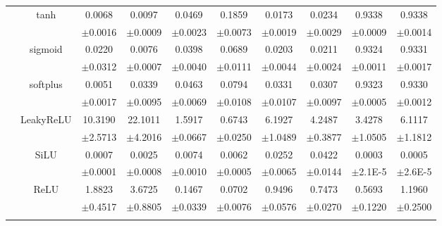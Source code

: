 \documentclass{article}
\begin{document}
\begin{longtable}[h!]{cccccccccc}
        & \multirow{2}{*}{tanh}
        &0.0068 & 0.0097 & 0.0469 & 0.1859 & 0.0173 & 0.0234 & 0.9338 & 0.9338\\
        &&\scriptsize $\pm$0.0016&\scriptsize$\pm$0.0009&\scriptsize$\pm$0.0023&\scriptsize$\pm$0.0073&\scriptsize$\pm$0.0019&\scriptsize$\pm$0.0029&\scriptsize$\pm$0.0009&\scriptsize$\pm$0.0014\\
        \cline{3-10}\rule{0pt}{2.3ex}

        & \multirow{2}{*}{sigmoid}
        &0.0220 & 0.0076 & 0.0398 & 0.0689 & 0.0203 & 0.0211 & 0.9324 & 0.9331\\
        &&\scriptsize $\pm$0.0312&\scriptsize$\pm$0.0007&\scriptsize$\pm$0.0040&\scriptsize$\pm$0.0111&\scriptsize$\pm$0.0044&\scriptsize$\pm$0.0024&\scriptsize$\pm$0.0011&\scriptsize$\pm$0.0017\\
        \cline{3-10}\rule{0pt}{2.3ex}

        & \multirow{2}{*}{softplus}
        &0.0051 & 0.0339 & 0.0463 & 0.0794 & 0.0331 & 0.0307 & 0.9323 & 0.9330\\
        &&\scriptsize $\pm$0.0017&\scriptsize$\pm$0.0095&\scriptsize$\pm$0.0069&\scriptsize$\pm$0.0108&\scriptsize$\pm$0.0107&\scriptsize$\pm$0.0097&\scriptsize$\pm$0.0005&\scriptsize$\pm$0.0012\\
        \cline{3-10}\rule{0pt}{2.3ex}

        & \multirow{2}{*}{LeakyReLU}
        &10.3190 & 22.1011 & 1.5917 & 0.6743 & 6.1927 & 4.2487 & 3.4278 & 6.1117\\
        &&\scriptsize $\pm$2.5713&\scriptsize$\pm$4.2016&\scriptsize$\pm$0.0667&\scriptsize$\pm$0.0250&\scriptsize$\pm$1.0489&\scriptsize$\pm$0.3877&\scriptsize$\pm$1.0505&\scriptsize$\pm$1.1812\\

        \hline\rule{0pt}{2.3ex}

        \multirow{14}{*}{$\textsf{MAE}_\textsf{symm}^{P}$} 
        & \multirow{2}{*}{SiLU}
        & {0.0007} & {0.0025} & {0.0074} & {0.0062} & {0.0252} & {0.0422} & {0.0003} & {0.0005}\\
        && \scriptsize {$\pm$0.0001} & \scriptsize {$\pm$0.0008} & \scriptsize {$\pm$0.0010} & \scriptsize {$\pm$0.0005} & \scriptsize {$\pm$0.0065} & \scriptsize {$\pm$0.0144} & \tiny {$\pm$2.1E-5} & \tiny {$\pm$2.6E-5}\\
        \cline{3-10}\rule{0pt}{2.3ex}

        & \multirow{2}{*}{ReLU}
        &1.8823 & 3.6725 & 0.1467 & 0.0702 & 0.9496 & 0.7473 & 0.5693 & 1.1960\\
        &&\scriptsize $\pm$0.4517&\scriptsize$\pm$0.8805&\scriptsize$\pm$0.0339&\scriptsize$\pm$0.0076&\scriptsize$\pm$0.0576&\scriptsize$\pm$0.0270&\scriptsize$\pm$0.1220&\scriptsize$\pm$0.2500\\
        \cline{3-10}\rule{0pt}{2.3ex}


\end{longtable}
\end{document}
